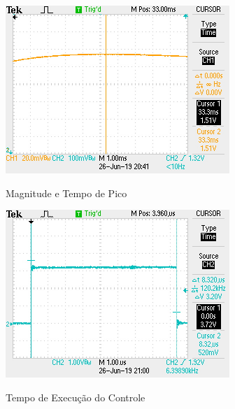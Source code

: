 \documentclass[
	12pt,				%
	article,			%
	openright,			%
	oneside,
	a4paper,			%
	chapter=TITLE,		%
	section=TITLE,		%
	english,			%
	french,				%
	spanish,			%
	brazil,				%
]{abntex2}
\begin{document}
\begin{apendicesenv}
        	\begin{figure}[htbp]
            	\centering
            	\caption{Magnitude e Tempo de Pico}
            	\includegraphics[width=\textwidth,height=240px,keepaspectratio]{imgs/ftmf/overshoot.JPG}
            	\label{fig-ftmf-overshoot}
        	\end{figure}
        	
        	\begin{figure}[htbp]
            	\centering
            	\caption{Tempo de Execução do Controle}
            	\includegraphics[width=\textwidth,height=240px,keepaspectratio]{imgs/ftmf/control_execution_time.JPG}
            	\label{fig-ftmf-execution_time}
        	\end{figure}
        	

\end{apendicesenv}
\end{document}
